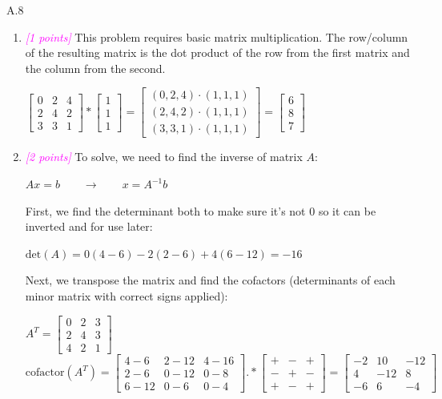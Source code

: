 \documentclass{article}
\newcommand{\1}{\mathbf{1}}
\newcommand{\points}[1]{\small\textcolor{magenta}{\emph{[#1 points]}} \normalsize}
\begin{document}
A.8 
\begin{enumerate}
	\item \points{1} This problem requires basic matrix multiplication. The row/column of the resulting matrix is the dot product of the row from the first matrix and the column from the second. 
	\begin{center}
		$\begin{bmatrix}0&2&4 \\ 2&4&2 \\ 3&3&1 \end{bmatrix} *\begin{bmatrix}1 \\1 \\ 1 \end{bmatrix}= \begin{bmatrix} (0,2,4)\cdot(1,1,1) \\ (2,4,2)\cdot(1,1,1) \\ (3,3,1)\cdot(1,1,1) \end{bmatrix}= \begin{bmatrix}6 \\8 \\ 7 \end{bmatrix}$
	\end{center}
	\item \points{2} To solve, we need to find the inverse of matrix $A$:
	\begin{center}
		$Ax=b \qquad \rightarrow \qquad x=A^{-1}b$
	\end{center}
	First, we find the determinant both to make sure it's not 0 so it can be inverted and for use later:
	\begin{center}
		$\text{det}(A)=0(4-6)-2(2-6)+4(6-12)=-16$
	\end{center}
	Next, we transpose the matrix and find the cofactors (determinants of each minor matrix with correct signs applied):
	\begin{center}
		$A^T=\begin{bmatrix}0&2&3 \\ 2&4&3 \\ 4&2&1 \end{bmatrix}$\\
		$\text{cofactor}(A^T)=\begin{bmatrix}4-6 &2-12&4-16 \\ 2-6&0-12&0-8 \\ 6-12&0-6&0-4 \end{bmatrix} .* \begin{bmatrix}+ &-&+ \\ -&+&- \\ +&-&+ \end{bmatrix}= \begin{bmatrix}-2&10&-12 \\ 4&-12&8 \\ -6&6&-4 \end{bmatrix}$

\end{center}
\end{enumerate}
\end{document}
